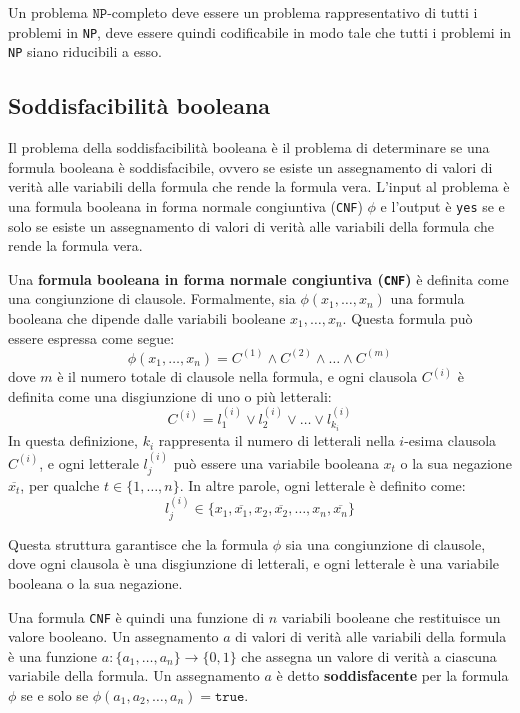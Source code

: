 Un problema $\texttt{NP}$-completo deve essere un problema rappresentativo di tutti
i problemi in \texttt{NP}, deve essere quindi codificabile in modo tale che tutti i problemi
in \texttt{NP} siano riducibili a esso.

\subsection{Soddisfacibilità booleana}
Il problema della soddisfacibilità booleana è il problema di determinare se una formula booleana
è soddisfacibile, ovvero se esiste un assegnamento di valori di verità alle variabili della formula
che rende la formula vera. L'input al problema è una formula booleana in forma normale congiuntiva
(\texttt{CNF}) $\phi$ e l'output è \texttt{yes} se e solo se esiste un assegnamento di valori di verità
alle variabili della formula che rende la formula vera.

Una \textbf{formula booleana in forma normale congiuntiva (\texttt{CNF})} è definita come una
congiunzione di clausole. Formalmente, sia $\phi(x_1, \dots, x_n)$ una formula booleana
che dipende dalle variabili booleane $x_1, \dots, x_n$. Questa formula può essere espressa
come segue:
\[
\phi(x_1, \dots, x_n) = C^{(1)} \land C^{(2)} \land \dots \land C^{(m)}
\]
dove $m$ è il numero totale di clausole nella formula, e ogni clausola $C^{(i)}$ è definita
come una disgiunzione di uno o più letterali:
\[
C^{(i)} = l_1^{(i)} \lor l_2^{(i)} \lor \dots \lor l_{k_i}^{(i)}
\]
In questa definizione, $k_i$ rappresenta il numero di letterali nella $i$-esima clausola
$C^{(i)}$, e ogni letterale $l_j^{(i)}$ può essere una variabile booleana $x_t$ o la sua
negazione $\overline{x_t}$, per qualche $t \in \{1, \dots, n\}$. In altre parole, ogni letterale
è definito come:
\[
l_j^{(i)} \in \{x_1, \overline{x_1}, x_2, \overline{x_2}, \dots, x_n, \overline{x_n}\}
\]

Questa struttura garantisce che la formula $\phi$ sia una congiunzione di clausole, dove
ogni clausola è una disgiunzione di letterali, e ogni letterale è una variabile booleana
o la sua negazione.

Una formula \texttt{CNF} è quindi una funzione di $n$ variabili booleane che
restituisce un valore booleano. Un assegnamento $a$ di valori di verità alle
variabili della formula è una funzione $a: \{a_1, \dots, a_n\} \to \{0, 1\}$
che assegna un valore di verità a ciascuna variabile della formula. Un
assegnamento $a$ è detto \textbf{soddisfacente} per la formula $\phi$
se e solo se $\phi(a_1, a_2, \dots, a_n) = \texttt{true}$.
